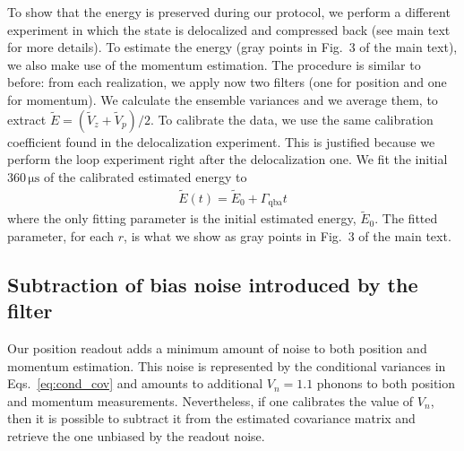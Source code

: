 \documentclass[aps, 
reprint, 
notitlepage,  superscriptaddress, 
onecolumn]{revtex4-1}
\newcommand{\<}{\langle}
\renewcommand{\>}{\rangle}
\newcommand{\Gqba}{\Gamma_\text{qba}}
\begin{document}
To show that the energy is preserved during our protocol,
we perform a different experiment in which the state is delocalized and compressed back (see main text for more details).
To estimate the energy (gray points in Fig.~3 of the main text), we also make use of the momentum estimation.
%
The procedure is similar to before: from each realization, we apply now two filters (one for position and one for momentum).
We calculate the ensemble variances and we average them, to extract $\widetilde{E} = (\widetilde{V}_z + \widetilde{V}_p)/2$.
%
To calibrate the data, we use the same calibration coefficient found in the delocalization experiment.
%
This is justified because we perform the loop experiment right after the delocalization one.
%
We fit the initial $360\,\mathrm{\mu s}$ of the calibrated estimated energy to
\begin{eqnarray}
    \widetilde{E}(t)=\widetilde{E}_0+\Gqba t
\end{eqnarray}
where the only fitting parameter is the initial estimated energy, $\widetilde{E}_0$. 
The fitted parameter, for each $r$, is what we show as gray points in Fig.~3 of the main text.

\subsection{Subtraction of bias noise introduced by the filter}
\label{sec: noise subtraction}

Our position readout adds a minimum amount of noise to both position and momentum estimation.
%
This noise is represented by the conditional variances in Eqs.~\eqref{eq:cond_cov} and amounts to additional $V_n=1.1$ phonons to both position and momentum measurements.
%
Nevertheless, if one calibrates the value of $V_n$, then it is possible to subtract it from the estimated covariance matrix and retrieve the one unbiased by the readout noise.
\end{document}
